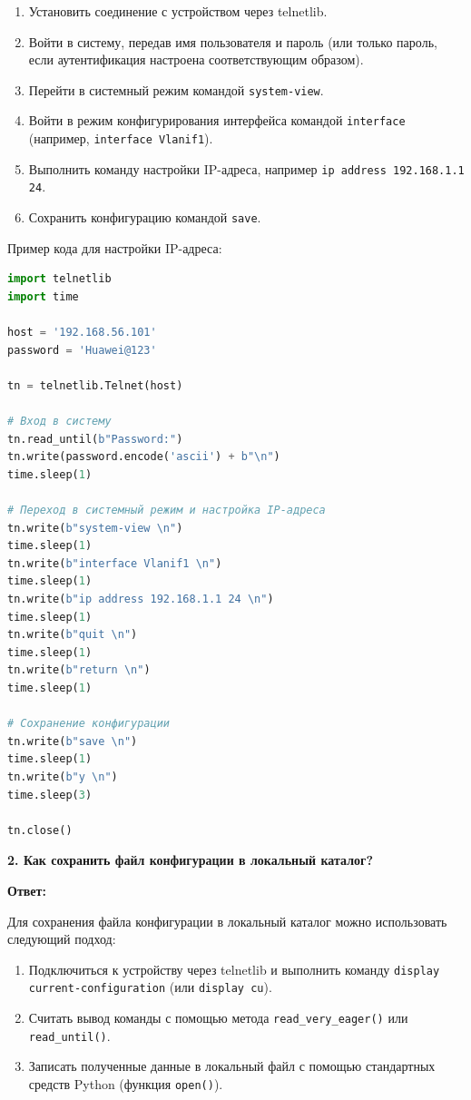 \begin{enumerate}
    \item Установить соединение с устройством через telnetlib.
    \item Войти в систему, передав имя пользователя и пароль (или только пароль, если аутентификация настроена соответствующим образом).
    \item Перейти в системный режим командой \texttt{system-view}.
    \item Войти в режим конфигурирования интерфейса командой \texttt{interface} (например, \texttt{interface Vlanif1}).
    \item Выполнить команду настройки IP-адреса, например \texttt{ip address 192.168.1.1 24}.
    \item Сохранить конфигурацию командой \texttt{save}.
\end{enumerate}

Пример кода для настройки IP-адреса:

\begin{lstlisting}[language=Python]
import telnetlib
import time

host = '192.168.56.101'
password = 'Huawei@123'

tn = telnetlib.Telnet(host)

# Вход в систему
tn.read_until(b"Password:")
tn.write(password.encode('ascii') + b"\n")
time.sleep(1)

# Переход в системный режим и настройка IP-адреса
tn.write(b"system-view \n")
time.sleep(1)
tn.write(b"interface Vlanif1 \n")
time.sleep(1)
tn.write(b"ip address 192.168.1.1 24 \n")
time.sleep(1)
tn.write(b"quit \n")
time.sleep(1)
tn.write(b"return \n")
time.sleep(1)

# Сохранение конфигурации
tn.write(b"save \n")
time.sleep(1)
tn.write(b"y \n")
time.sleep(3)

tn.close()
\end{lstlisting}

\textbf{2. Как сохранить файл конфигурации в локальный каталог?}

\textbf{Ответ:}

Для сохранения файла конфигурации в локальный каталог можно использовать следующий подход:

\begin{enumerate}
    \item Подключиться к устройству через telnetlib и выполнить команду \texttt{display current-configuration} (или \texttt{display cu}).
    \item Считать вывод команды с помощью метода \texttt{read\_very\_eager()} или \texttt{read\_until()}.
    \item Записать полученные данные в локальный файл с помощью стандартных средств Python (функция \texttt{open()}).
\end{enumerate}

